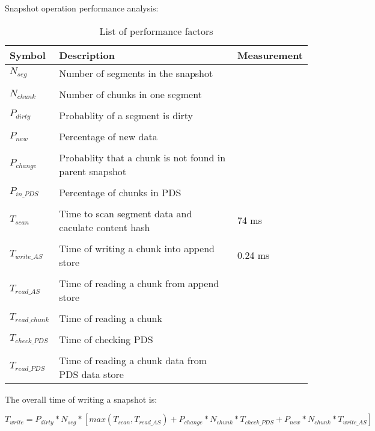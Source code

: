 Snapshot operation performance analysis:
\begin{table}
    \begin{tabular}{l p{1.5in} l}
        \hline
        Symbol & Description & Measurement \\ \hline
        $N_{seg}$ & Number of segments in the snapshot & ~ \\ [1ex] \\ [-1.5ex]
        $N_{chunk}$ & Number of chunks in one segment & ~ \\ [1ex] \\ [-1.5ex]
        $P_{dirty}$ & Probablity of a segment is dirty & ~ \\ [1ex] \\ [-1.5ex]
        $P_{new}$ & Percentage of new data & ~ \\ [1ex] \\ [-1.5ex]
        $P_{change}$ & Probablity that a chunk is not found in parent snapshot & ~ \\ [1ex] \\ [-1.5ex]
        $P_{in\_PDS}$ & Percentage of chunks in PDS & ~ \\ [1ex] \\ [-1.5ex]
        $T_{scan}$ & Time to scan segment data and caculate content hash & 74 ms \\ [1ex] \\ [-1.5ex]
        $T_{write\_AS}$ & Time of writing a chunk into append store & 0.24 ms \\ [1ex] \\ [-1.5ex]
        $T_{read\_AS}$ & Time of reading a chunk from append store & ~ \\ [1ex] \\ [-1.5ex]
        $T_{read\_chunk}$ & Time of reading a chunk & ~ \\ [1ex] \\ [-1.5ex]
        $T_{check\_PDS}$ & Time of checking PDS & ~ \\ [1ex] \\ [-1.5ex]
        $T_{read\_PDS}$ & Time of reading a chunk data from PDS data store& ~ \\
        \hline
    \end{tabular}
    \caption{List of performance factors}
    \label{tab:as_param}
\end{table}

The overall time of writing a snapshot is:

\begin{dmath}
T_{write} = P_{dirty} * N_{seg} * [max(T_{scan}, T_{read\_AS}) + P_{change} * N_{chunk} * T_{check\_PDS} + P_{new} * N_{chunk} * T_{write\_AS}]
\end{dmath}


